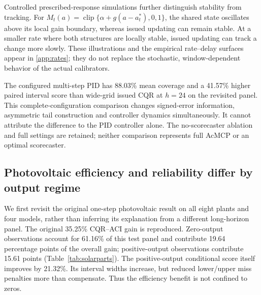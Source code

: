 \documentclass[preprint,11pt]{elsarticle}
\newcommand{\clip}{\operatorname{clip}}
\begin{document}
Controlled prescribed-response simulations further distinguish stability from tracking.
For $M_t(a)=\clip\{\alpha+g(a-a^*_t),0,1\}$, the shared state oscillates above its local
gain boundary, whereas issued updating can remain stable. At a smaller rate where
both structures are locally stable, issued updating can track a change more slowly.
These illustrations and the empirical rate--delay surfaces appear in \ref{app:rates};
they do not replace the stochastic, window-dependent behavior of the actual calibrators.

The configured multi-step PID has 88.03\% mean coverage and a 41.57\% higher
paired interval score than wide-grid issued CQR at $h=24$ on the revisited panel.
This complete-configuration comparison changes signed-error information, asymmetric
tail construction and controller dynamics simultaneously. It cannot attribute the
difference to the PID controller alone. The no-scorecaster ablation and full settings
are retained; neither comparison represents full AcMCP or an optimal scorecaster.

\subsection{Photovoltaic efficiency and reliability differ by output regime}
We first revisit the original one-step photovoltaic result on all eight plants and
four models, rather than inferring its explanation from a different long-horizon
panel. The original 35.25\% CQR--ACI gain is reproduced. Zero-output observations
account for 61.16\% of this test panel and contribute 19.64 percentage points of
the overall gain; positive-output observations contribute 15.61 points
(Table~\ref{tab:solarparts}). The positive-output conditional score itself improves
by 21.32\%. Its interval widths increase, but reduced lower/upper miss penalties
more than compensate. Thus the efficiency benefit is not confined to zeros.

\begin{table}[htbp]\centering\scriptsize
\caption{Original one-step PV decomposition, 32 model--series pairs. Share and coverage
are percent. Gain compares CQR with residual ACI within the listed group. Contribution
uses each pair's overall residual score as denominator, then averages; zero and positive
contributions sum to the overall gain. R denotes residual. Tuned rows reuse original
validation choices. Outcome groups are evaluation-only.}
\label{tab:solarparts}
\end{table}
\end{document}
